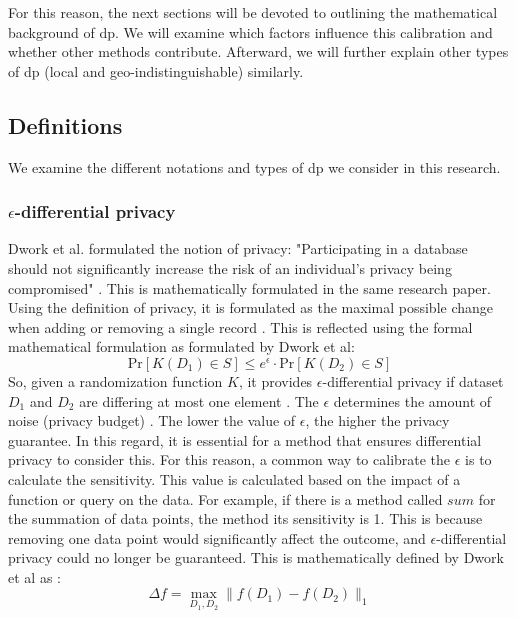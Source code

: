 For this reason, the next sections will be devoted to outlining the mathematical background of \gls{dp}.
We will examine which factors influence this calibration and whether other methods contribute.
Afterward, we will further explain other types of \gls{dp} (local and geo-indistinguishable) similarly.


\newpage
\subsection{Definitions}
We examine the different notations and types of \gls{dp} we consider in this research.

\subsubsection{$\epsilon$-differential privacy}
Dwork et al. formulated the notion of privacy: "Participating in a database should not significantly increase the risk of an individual's privacy being compromised" \cite{dwork_differential_2006}.
This is mathematically formulated in the same research paper.
Using the definition of privacy, it is formulated as the maximal possible change when adding or removing a single record \citep{dwork_differential_2006, friedman_data_2010}.
This is reflected using the formal mathematical formulation as formulated by Dwork et al:
\begin{equation}
  {\mathrm{Pr}}[K(D_{1})\in S]\leq e^{\epsilon} \cdot {\mathrm{Pr}}[K(D_{2})\in S]
  \label{pure-dp}
\end{equation}
So, given a randomization function $K$, it provides $\epsilon$-differential privacy if dataset $D_1$ and $D_2$ are differing at most one element \citep{dwork_differential_2006}.
The $\epsilon$ determines the amount of noise (privacy budget) \citep{friedman_data_2010}.
The lower the value of $\epsilon$, the higher the privacy guarantee.
In this regard, it is essential for a method that ensures differential privacy to consider this.
For this reason, a common way to calibrate the $\epsilon$ is to calculate the sensitivity.
This value is calculated based on the impact of a function or query on the data.
For example, if there is a method called $sum$ for the summation of data points, the method its sensitivity is 1.
This is because removing one data point would significantly affect the outcome, and $\epsilon$-differential privacy could no longer be guaranteed.
This is mathematically defined by Dwork et al as \citep{dwork_differential_2006}:
\begin{equation}
  \Delta f=\operatorname*{max}_{D_{1},D_{2}}\|f(D_{1})-f(D_{2})\|_{1}
  \label{sensitivity-dp}
\end{equation}
